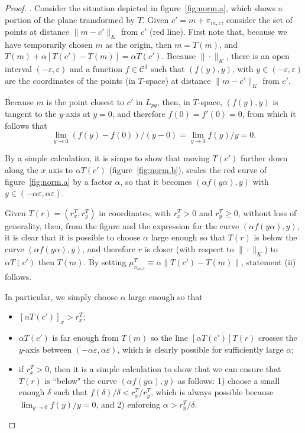 \documentclass[11pt]{article}
\begin{document}
\begin{proof}
. 
Consider the situation depicted in figure~\ref{fig:norm.a}, which shows a portion of the plane transformed by $T$. 
Given $c'=m+\pi_{m,c}$, consider the set of points at distance $\|m-c'\|_K$ from $c'$ (red line). 
First note that, because we have temporarily chosen $m$ as the origin, then $m=T(m)$, and $T(m)+\alpha [T(c')-T(m)] = \alpha T(c')$. 
Because $\|\cdot\|_K$, there is an open interval $(-\varepsilon,\varepsilon)$ and 
	a function $f\in\mathcal{C}^1$ such that $(f(y),y)$, with $y\in(-\varepsilon,\varepsilon)$ 
	are the coordinates of the points (in $T$-space) at distance $\|m-c'\|_K$ from $c'$. 

Because $m$ is the point closest to $c'$ in $L_{pq}$, then, 
	in $T$-space, $(f(y),y)$ is tangent to the $y$-axis at $y=0$, 
	and therefore $f(0)=f'(0)=0$, from which it follows that
	\[ \displaystyle{\lim_{y\rightarrow 0} (f(y)-f(0)) / (y-0)} =   \displaystyle{\lim_{y\rightarrow 0} f(y)/y} = 0. \]

By a simple calculation, it is simpe to show that moving $T(c')$ further down along the $x$ axis to $\alpha T(c')$
	(figure~\ref{fig:norm.b}), 
	scales the red curve of figure~\ref{fig:norm.a} by a factor $\alpha$, so that it becomes 
	$(\alpha f(y\alpha), y)$ with $y\in(-\alpha\varepsilon, \alpha\varepsilon)$. 

Given $T(r)=(r^T_x,r^T_y)$ in coordinates, with $r^T_x > 0$ and $r^T_y \ge 0$, without loss of generality, 
	then, from the figure and the expression for the curve $(\alpha f(y\alpha), y)$, it is clear that it is 
	possible to choose $\alpha$ large enough so that $T(r)$ is below the curve $(\alpha f(y\alpha), y)$, 
	and therefore $r$ is closer (with respect to $\|\cdot\|_K$) to $\alpha T(c')$ then $T(m)$. By setting $\mu^T_{\pi_{m,c}} \equiv \alpha \|T(c')-T(m)\|$, statement (ii) follows. 

In particular, we simply choose $\alpha$ large enough so that
\begin{itemize}
	\item $[\alpha T(c')]_x > r^T_x$; 
	\item $\alpha T(c')$ is far enough from $T(m)$ so the line $\overline{[\alpha T(c')] T(r)}$ crosses the $y$-axis between 
		$(-\alpha\varepsilon, \alpha\varepsilon)$, which is clearly possible for sufficiently large $\alpha$; 
	\item if $r^T_x > 0$, then it is a simple calculation to show that 
		we can ensure that $T(r)$ is ``below" the curve $(\alpha f(y\alpha), y)$ as follows:
		1) choose a small enough $\delta$ such that $f(\delta)/\delta < r^T_x/r^T_y$, 
		which is always possible because $\lim_{y\rightarrow 0} f(y)/y = 0$, 
		and 2) enforcing $\alpha > r^T_y / \delta$. 
\end{itemize}









\end{proof}
\end{document}
